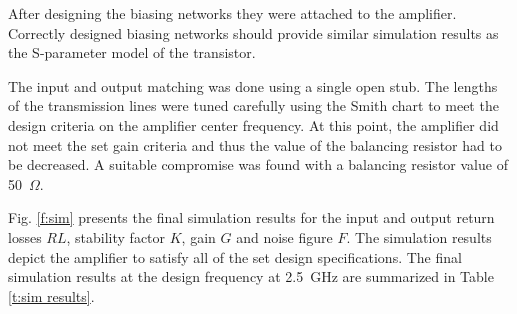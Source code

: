 \documentclass[a4paper, 12pt]{article}
\begin{document}
After designing the biasing networks they were attached to the amplifier. 
Correctly designed biasing networks should provide similar simulation results 
as the S-parameter model of the transistor.

The input and output matching was done using a single open stub. The lengths 
of the transmission lines were tuned carefully using the Smith chart to meet 
the design criteria on the amplifier center frequency. At this point, the 
amplifier did not meet the set gain criteria and thus the value of the balancing 
resistor had to be decreased. A suitable compromise was found with a balancing 
resistor value of 50~$\Omega$. 

Fig. \ref{f:sim} presents the final simulation results for the input 
and output return losses $RL$, stability factor $K$, gain $G$ and noise figure 
$F$. The simulation results depict the amplifier to satisfy all of the set design 
specifications. The final simulation results at the design frequency at 2.5~GHz are summarized in Table \ref{t:sim results}.
\end{document}
